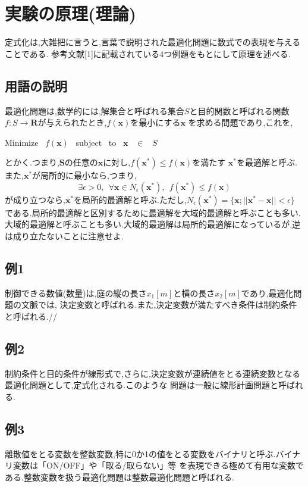 \documentclass[12pt]{jarticle}
\begin{document}

\section{実験の原理(理論)}
定式化は,大雑把に言うと,言葉で説明された最適化問題に数式での表現を与えることである.
参考文献[1]に記載されている4つ例題をもとにして原理を述べる.\\
\subsection{用語の説明}
最適化問題は,数学的には,解集合と呼ばれる集合$S$と目的関数と呼ばれる関数
$f:S \rightarrow \boldsymbol{R}$が与えられたとき,$f( \boldsymbol{x} )$を最小にする$ \boldsymbol{x} $
を求める問題であり,これを,
\begin{center}
	Minimize \ $f(\boldsymbol{x})$ \ subject \ to \ $\boldsymbol{x}$ \ $\in$ \ $S$
\end{center}
とかく.つまり,$\boldsymbol{S}$の任意の$\boldsymbol{x}$に対し,$f(\boldsymbol{x^*})\leq f(\boldsymbol{x})$を満たす
$\boldsymbol{x^*}$を最適解と呼ぶ.また,$\boldsymbol{x^*}$が局所的に最小なら,つまり,
\begin{equation}
	\exists \epsilon >0,\ \ \forall \boldsymbol{x} \in N_\epsilon(\boldsymbol{x^*}), \ \ f(\boldsymbol{x^*})\leq f(\boldsymbol{x})\nonumber
\end{equation}
が成り立つなら,$\boldsymbol{x^*}$を局所的最適解と呼ぶ.ただし,$N_\epsilon(\boldsymbol{x^*})=\{\boldsymbol{x};||\boldsymbol{x^*}-\boldsymbol{x}||<\epsilon\}$
である.局所的最適解と区別するために最適解を大域的最適解と呼ぶことも多い.大域的最適解と呼ぶことも多い.大域的最適解は局所的最適解になっているが,逆は成り立たないことに注意せよ.\\
\subsection{例1}
制御できる数値(数量)は,庭の縦の長さ$x_1[m]$と横の長さ$x_2[m]$であり,最適化問題の文脈では,
決定変数と呼ばれる.また,決定変数が満たすべき条件は制約条件と呼ばれる.//
\subsection{例2}
制約条件と目的条件が線形式で,さらに,決定変数が連続値をとる連続変数となる最適化問題として,定式化される.このような
問題は一般に線形計画問題と呼ばれる.
\subsection{例3}
離散値をとる変数を整数変数,特に0か1の値をとる変数をバイナリと呼ぶ.バイナリ変数は「ON/OFF」や「取る/取らない」等
を表現できる極めて有用な変数である.整数変数を扱う最適化問題は整数最適化問題と呼ばれる.
\end{document}
